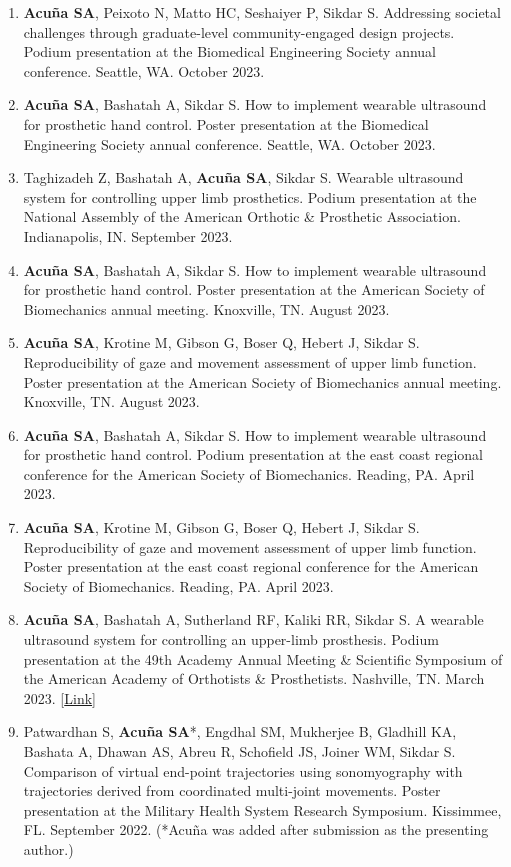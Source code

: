 \documentclass[letterpaper, 10pt]{article}
\begin{document}
\begin{enumerate}
    \item \textbf{Acuña SA}, Peixoto N, Matto HC, Seshaiyer P, Sikdar S. Addressing societal challenges through graduate-level community-engaged design projects. Podium presentation at the Biomedical Engineering Society annual conference. Seattle, WA. October 2023.
    \item \textbf{Acuña SA}, Bashatah A, Sikdar S. How to implement wearable ultrasound for prosthetic hand control. Poster presentation at the Biomedical Engineering Society annual conference. Seattle, WA. October 2023.
    \item Taghizadeh Z, Bashatah A, \textbf{Acuña SA}, Sikdar S. Wearable ultrasound system for controlling upper limb prosthetics. Podium presentation at the National Assembly of the American Orthotic \& Prosthetic Association. Indianapolis, IN. September 2023.
    \item \textbf{Acuña SA}, Bashatah A, Sikdar S. How to implement wearable ultrasound for prosthetic hand control. Poster presentation at the American Society of Biomechanics annual meeting. Knoxville, TN. August 2023.
    \item \textbf{Acuña SA}, Krotine M, Gibson G, Boser Q, Hebert J, Sikdar S. Reproducibility of gaze and movement assessment of upper limb function. Poster presentation at the American Society of Biomechanics annual meeting. Knoxville, TN. August 2023.
    \item \textbf{Acuña SA}, Bashatah A, Sikdar S. How to implement wearable ultrasound for prosthetic hand control. Podium presentation at the east coast regional conference for the American Society of Biomechanics. Reading, PA. April 2023.
    \item \textbf{Acuña SA}, Krotine M, Gibson G, Boser Q, Hebert J, Sikdar S. Reproducibility of gaze and movement assessment of upper limb function. Poster presentation at the east coast regional conference for the American Society of Biomechanics. Reading, PA. April 2023.
    \item \textbf{Acuña SA}, Bashatah A, Sutherland RF, Kaliki RR, Sikdar S. A wearable ultrasound system for controlling an upper-limb prosthesis. Podium presentation at the 49th Academy Annual Meeting \& Scientiﬁc Symposium of the American Academy of Orthotists \& Prosthetists. Nashville, TN. March 2023. [\href{https://journals.lww.com/jpojournal/Citation/2023/04001/UPPER_LIMB_PROSTHESES.10.aspx}{Link}]
    \item Patwardhan S, \textbf{Acuña SA}*, Engdhal SM, Mukherjee B, Gladhill KA, Bashata A, Dhawan AS, Abreu R, Schofield JS, Joiner WM,  Sikdar S. Comparison of virtual end-point trajectories using sonomyography with trajectories derived from coordinated multi-joint movements. Poster presentation at the Military Health System Research Symposium. Kissimmee, FL. September 2022. (*Acuña was added after submission as the presenting author.)

\end{enumerate}
\end{document}
